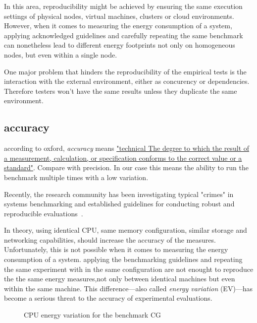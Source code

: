 In this area, reproducibility might be achieved by ensuring the same execution settings of physical nodes, virtual machines, clusters or cloud environments.
However, when it comes to measuring the energy consumption of a system, applying acknowledged guidelines and carefully repeating the same benchmark can nonetheless lead to different energy footprints not only on homogeneous nodes, but even within a single node.


One major problem that hinders the reproducibility of the empirical tests is the interaction with the external environment, either as concurency or dependencies. Therefore testers won't have the same results unless they duplicate the same environment.


\subsection{accuracy}
according to oxford, \emph{accuracy} means \href{https://www.lexico.com/definition/accuracy}{"technical The degree to which the result of a measurement, calculation, or specification conforms to the correct value or a standard"}.
Compare with precision. In our case this means the ability to run the benchmark multiple times with a low variation.

Recently, the research community has been investigating typical "crimes" in systems benchmarking and established guidelines for conducting robust and reproducible evaluations~\cite{DBLP:journals/corr/abs-1801-02381}.

In theory, using identical CPU, same memory configuration, similar storage and networking capabilities, should increase the accuracy of the measures. Unfortunately, this is not possible  when it comes to measuring the energy consumption of a system. applying the benchmarking guidelines and repeating the same experiment with in the same configuration are not enought to reproduce the the same energy measures,not only between identical machines but even within the same machine.
This difference---also called \emph{energy variation} (EV)---has become a serious threat to the accuracy of experimental evaluations.
\begin{figure}%
    \caption{CPU energy variation for the benchmark \textsf{CG}}\label{fig:motivation}
\end{figure}


